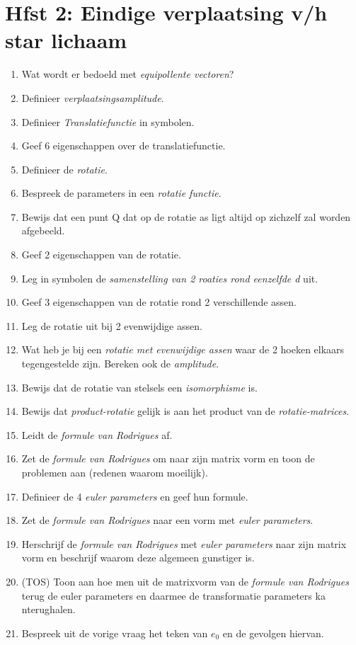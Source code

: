\documentclass[12pt]{article}
\begin{document}
    \maketitle

    \section{Hfst 2: Eindige verplaatsing v/h star lichaam}%
	\label{sec:Hfst_2:_Eindige_verplaatsing_v/h_star_lichaam}
    
	\begin{enumerate}
		\item Wat wordt er bedoeld met \emph{equipollente vectoren}?
		\item Definieer \emph{verplaatsingsamplitude}.
		\item Definieer \emph{Translatiefunctie} in symbolen.
		\item Geef 6 eigenschappen over de translatiefunctie.
		\item Definieer de \emph{rotatie}.
		\item Bespreek de parameters in een \emph{rotatie functie}.
		\item Bewijs dat een punt Q dat op de rotatie as ligt altijd op zichzelf zal worden afgebeeld.
		\item Geef 2 eigenschappen van de rotatie.
		\item Leg in symbolen de \emph{samenstelling van 2 roaties rond eenzelfde d} uit.
		\item Geef 3 eigenschappen van de rotatie rond 2 verschillende assen.
		\item Leg de rotatie uit bij 2 evenwijdige assen.
		\item Wat heb je bij een \emph{rotatie met evenwijdige assen} waar de 2 hoeken elkaars tegengestelde zijn. Bereken ook de \emph{amplitude}.
		\item Bewijs dat de rotatie van stelsels een \emph{isomorphisme} is.
		\item Bewijs dat \emph{product-rotatie} gelijk is aan het product van de \emph{rotatie-matrices}.
		\item Leidt de \emph{formule van Rodrigues} af.
		\item Zet de \emph{formule van Rodrigues} om naar zijn matrix vorm en toon de problemen aan (redenen waarom moeilijk).
		\item Definieer de 4 \emph{euler parameters} en geef hun formule.
		\item Zet de \emph{formule van Rodrigues} naar een vorm met \emph{euler parameters}.
		\item Herschrijf de \emph{formule van Rodrigues} met \emph{euler parameters} naar zijn matrix vorm en beschrijf waarom deze algemeen gunstiger is.
		\item (TOS) Toon aan hoe men uit de matrixvorm van de \emph{formule van Rodrigues} terug de euler parameters en daarmee de transformatie parameters ka nterughalen.
		\item Bespreek uit de vorige vraag het teken van $ e_0 $ en de gevolgen hiervan.
	\end{enumerate}
\end{document}
